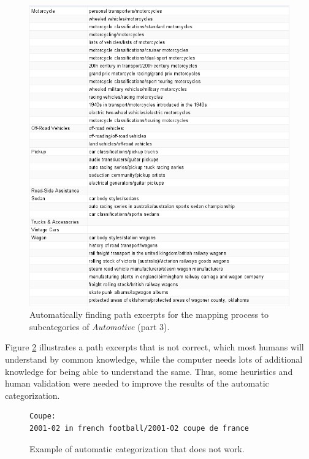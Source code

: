 \begin{figure}[h]
\centering
\includegraphics[width=\textwidth]{Chapters/Results/Automatic_classification_3}
\caption[Automatic mapping between categories and path excerpts, part 3]{Automatically finding path excerpts for the mapping process to subcategories of \emph{Automotive} (part 3).}
\label{fig:autoclassification3}
\end{figure}

Figure \ref{fig:wrong_automatic} illustrates a path excerpts that is not correct, which most humans will understand by common knowledge, while the computer needs lots of additional knowledge for being able to understand the same. Thus, some heuristics and human validation were needed to improve the results of the automatic categorization. 

\begin{figure}[h]
\centering
\begin{lstlisting}
Coupe:
2001-02 in french football/2001-02 coupe de france
\end{lstlisting}
\caption{Example of automatic categorization that does not work.}
\label{fig:wrong_automatic}
\end{figure}

